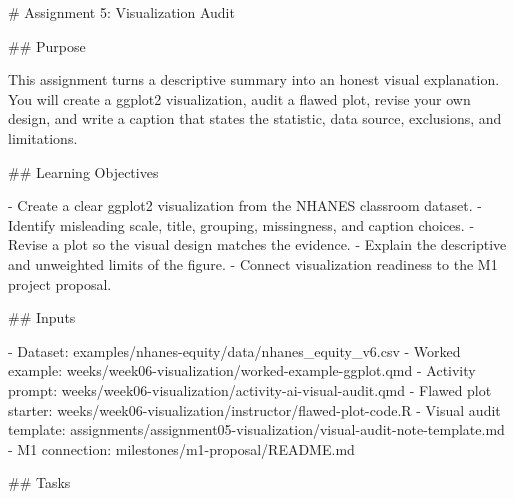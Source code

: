\documentclass[
  letterpaper,
  DIV=11,
  numbers=noendperiod,
  oneside]{scrreprt}
\newenvironment{Shaded}{\begin{snugshade}}{\end{snugshade}}
\newcommand{\FunctionTok}[1]{\textcolor[rgb]{0.28,0.35,0.67}{#1}}
\newcommand{\InformationTok}[1]{\textcolor[rgb]{0.37,0.37,0.37}{#1}}
\newcommand{\NormalTok}[1]{\textcolor[rgb]{0.00,0.23,0.31}{#1}}
\newcommand{\SpecialStringTok}[1]{\textcolor[rgb]{0.13,0.47,0.30}{#1}}
\begin{document}
\begin{Shaded}
\begin{Highlighting}[numbers=left,,]
\FunctionTok{\# Assignment 5: Visualization Audit }


\FunctionTok{\#\# Purpose}

\NormalTok{This assignment turns a descriptive summary into an honest visual explanation. You will create a }\InformationTok{\textasciigrave{}ggplot2\textasciigrave{}}\NormalTok{ visualization, audit a flawed plot, revise your own design, and write a caption that states the statistic, data source, exclusions, and limitations.}

\FunctionTok{\#\# Learning Objectives}

\SpecialStringTok{{-} }\NormalTok{Create a clear }\InformationTok{\textasciigrave{}ggplot2\textasciigrave{}}\NormalTok{ visualization from the NHANES classroom dataset.}
\SpecialStringTok{{-} }\NormalTok{Identify misleading scale, title, grouping, missingness, and caption choices.}
\SpecialStringTok{{-} }\NormalTok{Revise a plot so the visual design matches the evidence.}
\SpecialStringTok{{-} }\NormalTok{Explain the descriptive and unweighted limits of the figure.}
\SpecialStringTok{{-} }\NormalTok{Connect visualization readiness to the M1 project proposal.}

\FunctionTok{\#\# Inputs}

\SpecialStringTok{{-} }\NormalTok{Dataset: }\InformationTok{\textasciigrave{}examples/nhanes{-}equity/data/nhanes\_equity\_v6.csv\textasciigrave{}}
\SpecialStringTok{{-} }\NormalTok{Worked example: }\InformationTok{\textasciigrave{}weeks/week06{-}visualization/worked{-}example{-}ggplot.qmd\textasciigrave{}}
\SpecialStringTok{{-} }\NormalTok{Activity prompt: }\InformationTok{\textasciigrave{}weeks/week06{-}visualization/activity{-}ai{-}visual{-}audit.qmd\textasciigrave{}}
\SpecialStringTok{{-} }\NormalTok{Flawed plot starter: }\InformationTok{\textasciigrave{}weeks/week06{-}visualization/instructor/flawed{-}plot{-}code.R\textasciigrave{}}
\SpecialStringTok{{-} }\NormalTok{Visual audit template: }\InformationTok{\textasciigrave{}assignments/assignment05{-}visualization/visual{-}audit{-}note{-}template.md\textasciigrave{}}
\SpecialStringTok{{-} }\NormalTok{M1 connection: }\InformationTok{\textasciigrave{}milestones/m1{-}proposal/README.md\textasciigrave{}}

\FunctionTok{\#\# Tasks}


\end{Highlighting}
\end{Shaded}
\end{document}
